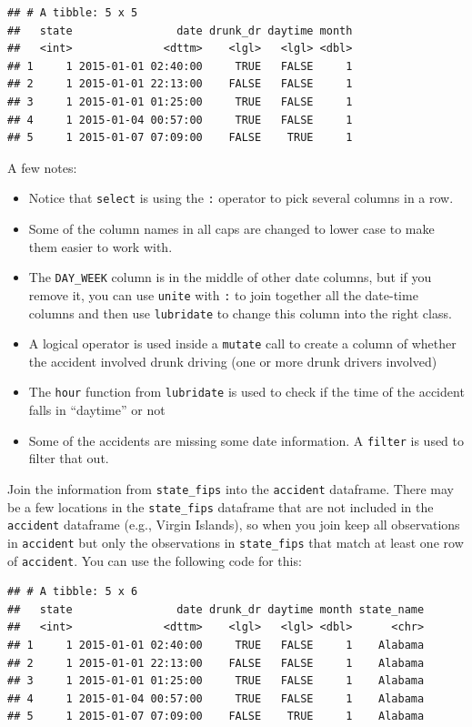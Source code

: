 \documentclass[]{book}
\providecommand{\tightlist}{%
  \setlength{\itemsep}{0pt}\setlength{\parskip}{0pt}}
\theoremstyle{definition}
\theoremstyle{definition}
\theoremstyle{definition}
\theoremstyle{remark}
\begin{document}
\begin{verbatim}
## # A tibble: 5 x 5
##   state                date drunk_dr daytime month
##   <int>              <dttm>    <lgl>   <lgl> <dbl>
## 1     1 2015-01-01 02:40:00     TRUE   FALSE     1
## 2     1 2015-01-01 22:13:00    FALSE   FALSE     1
## 3     1 2015-01-01 01:25:00     TRUE   FALSE     1
## 4     1 2015-01-04 00:57:00     TRUE   FALSE     1
## 5     1 2015-01-07 07:09:00    FALSE    TRUE     1
\end{verbatim}

A few notes:

\begin{itemize}
\tightlist
\item
  Notice that \texttt{select} is using the \texttt{:} operator to pick
  several columns in a row.
\item
  Some of the column names in all caps are changed to lower case to make
  them easier to work with.
\item
  The \texttt{DAY\_WEEK} column is in the middle of other date columns,
  but if you remove it, you can use \texttt{unite} with \texttt{:} to
  join together all the date-time columns and then use
  \texttt{lubridate} to change this column into the right class.
\item
  A logical operator is used inside a \texttt{mutate} call to create a
  column of whether the accident involved drunk driving (one or more
  drunk drivers involved)
\item
  The \texttt{hour} function from \texttt{lubridate} is used to check if
  the time of the accident falls in ``daytime'' or not
\item
  Some of the accidents are missing some date information. A
  \texttt{filter} is used to filter that out.
\end{itemize}

Join the information from \texttt{state\_fips} into the
\texttt{accident} dataframe. There may be a few locations in the
\texttt{state\_fips} dataframe that are not included in the
\texttt{accident} dataframe (e.g., Virgin Islands), so when you join
keep all observations in \texttt{accident} but only the observations in
\texttt{state\_fips} that match at least one row of \texttt{accident}.
You can use the following code for this:

\begin{verbatim}
## # A tibble: 5 x 6
##   state                date drunk_dr daytime month state_name
##   <int>              <dttm>    <lgl>   <lgl> <dbl>      <chr>
## 1     1 2015-01-01 02:40:00     TRUE   FALSE     1    Alabama
## 2     1 2015-01-01 22:13:00    FALSE   FALSE     1    Alabama
## 3     1 2015-01-01 01:25:00     TRUE   FALSE     1    Alabama
## 4     1 2015-01-04 00:57:00     TRUE   FALSE     1    Alabama
## 5     1 2015-01-07 07:09:00    FALSE    TRUE     1    Alabama
\end{verbatim}
\end{document}
